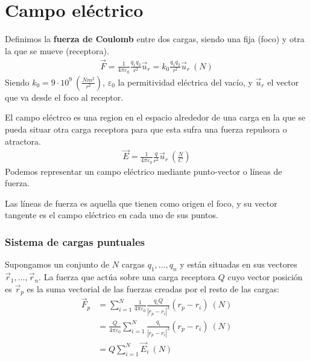 \documentclass{../FisicaII.tex}
\begin{document}
\chapter{Campo eléctrico}
\begin{defin}
	Definimos la \textbf{fuerza de Coulomb} entre dos cargas, siendo una fija
	(foco) y otra la que se mueve (receptora).
	\begin{equation}
		\begin{split}
			\vec{F} = \frac{1}{4\pi \varepsilon_{0}} \frac{q_1q_2}{r^{2}}\vec{u}_{r}
			= k_{0} \frac{q_1q_2}{r^{2}}\vec{u}_{r}~(N)
		\end{split}
	\end{equation}
	Siendo $k_{0} = 9 \cdot 10^{9}~( \frac{Nm^{2}}{r^{2}})$, $\varepsilon_{0}$
	la permitividad eléctrica del vacío, y $\vec{u}_{r}$ el vector que va desde
	el foco al receptor.
\end{defin}
\begin{defin}
	El campo eléctrco es una region en el espacio alrededor de una carga en la que
	se pueda situar otra carga receptora para que esta sufra una fuerza
	repulsora o atractora.
	\begin{equation}
		\begin{split}
			\vec{E} = \frac{1}{4\pi \varepsilon_{0}} \frac{q}{r^{2}}\vec{u}_{r}
			~\left(\frac{N}{C}\right)
		\end{split}
	\end{equation}
	Podemos representar un campo eléctrico mediante punto-vector o líneas de
	fuerza.
\end{defin}
\begin{defin}
	Las líneas de fuerza es aquella que tienen como origen el foco, y su vector
	tangente es el campo eléctrico en cada uno de sus puntos.
\end{defin}
\subsection{Sistema de cargas puntuales}
Supongamos un conjunto de $N$  cargas $q_{1},\dots ,q_{n}$ y están situadas en
sus vectores $\vec{r}_{1},\dots ,\vec{r}_{n}$. La fuerza que actúa sobre una
carga receptora $Q$ cuyo vector posición es $\vec{r}_{p}$ es la suma vectorial
de las fuerzas creadas por el resto de las cargas:
\begin{equation}
	\begin{split}
		\vec{F}_{p} &= \sum_{i=1}^{N} \frac{1}{4\pi\varepsilon_{0}}
		\frac{q_{i}Q}{|r_{p}-r_{i}|^{3}}(r_{p}-r_{i}) ~(N)\\
					&= \frac{Q}{4\pi\varepsilon_{0}}\sum_{i=1}^{N}
					\frac{q_{i}}{|r_{p}-r_{i}|^{3}}(r_{p}-r_{i})~(N)\\
					&= Q \sum_{i=1}^{N} \vec{E}_{i}~(N)
	\end{split}
\end{equation}
\end{document}
